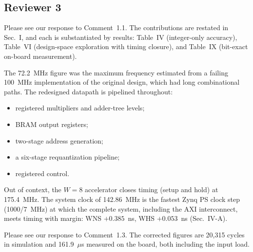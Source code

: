 \documentclass[10pt,a4paper]{article}
\begin{document}
\subsection*{Reviewer 3}

Please see our response to Comment~1.1. The contributions are restated in Sec.~I, and each is
substantiated by results: Table~IV (integer-only accuracy), Table~VI (design-space exploration
with timing closure), and Table~IX (bit-exact on-board measurement).

The 72.2~MHz figure was the maximum frequency estimated from a failing 100~MHz implementation of the
original design, which had long combinational paths. The redesigned datapath is pipelined
throughout:
\begin{itemize}
  \item registered multipliers and adder-tree levels;
  \item BRAM output registers;
  \item two-stage address generation;
  \item a six-stage requantization pipeline;
  \item registered control.
\end{itemize}
Out of context, the $W{=}8$ accelerator closes timing (setup and hold) at 175.4~MHz. The
system clock of 142.86~MHz is the fastest Zynq PS clock step (1000/7~MHz) at which the
complete system, including the AXI interconnect, meets timing with margin: WNS $+0.385$~ns,
WHS $+0.053$~ns (Sec.~IV-A).

Please see our response to Comment~1.3. The corrected figures are 20,315 cycles in simulation
and 161.9~$\mu$s measured on the board, both including the input load.
\end{document}
